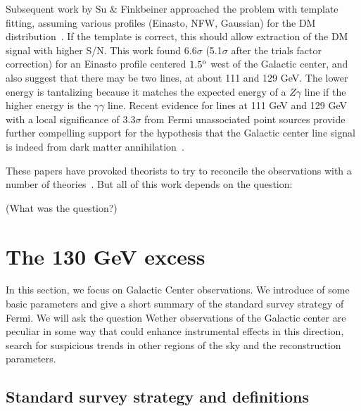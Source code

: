 \documentclass[aps,twocolumn,prd,superscriptaddress,showpacs,nofootinbib,fixfloat]{revtex4}
\newcommand{\degree}{^{\rm o}}
\begin{document}
Subsequent work by Su \& Finkbeiner approached the problem
with template fitting, assuming various profiles (Einasto,
NFW, Gaussian) for the DM distribution~\citep{linepaper}.
If the template is correct, this should allow extraction of
the DM signal with higher S/N.  This work found 6.6$\sigma$
(5.1$\sigma$ after the trials factor correction) for an
Einasto profile centered $1.5\degree$ west of the Galactic
center, and also suggest that there may be two lines, at
about 111 and 129 GeV.  The lower energy is tantalizing
because it matches the expected energy of a $Z\gamma$ line
if the higher energy is the $\gamma\gamma$ line.  Recent
evidence for lines at 111 GeV and 129 GeV with a local
significance of $3.3\sigma$ from Fermi unassociated point
sources provide further compelling support for the
hypothesis that the Galactic center line signal is indeed
from dark matter annihilation~\cite{doubleline}.

These papers have provoked theorists to try to reconcile the
observations with a number of
theories~\citep{Dudas:2012,Choi:2012,Kyae:2012,Lee:2012,Rajaraman:2012,Acharya:2012,Garny:2012,Buckley:2012,Chu:2012,Kang:2012,Buchmuller:2012,Heo:2012,Park:2012,Tulin:2012,Cline:2012,Weiner:2012}.
But all of this work depends on the question:

(What was the question?)



\section{The 130 GeV excess}
In this section, we focus on Galactic Center observations. We introduce of
some basic parameters and give a short summary of the standard survey strategy
of Fermi. We will ask the question Wether observations of the Galactic center
are peculiar in some way that could enhance instrumental effects in this
direction, search for suspicious trends in other regions of the sky and the
reconstruction parameters.



\subsection{Standard survey strategy and definitions}
\label{sec:conventions}
\end{document}
